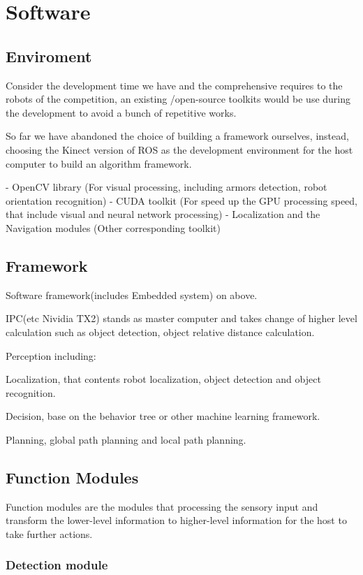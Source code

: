 \section{Software}
\subsection{Enviroment}

Consider the development time we have and the comprehensive requires to the robots of the competition, an existing /open-source toolkits would be use during the development to avoid a bunch of repetitive works.

So far we have abandoned the choice of building a framework ourselves, instead, choosing the Kinect version of ROS as the development environment for the host computer to build an algorithm framework.

- OpenCV library (For visual processing, including armors detection, robot orientation recognition)
- CUDA toolkit (For speed up the GPU processing speed, that include visual and neural network processing)
- Localization and the Navigation modules (Other corresponding toolkit)

\subsection{Framework}

Software framework(includes Embedded system) on above.

IPC(etc Nividia TX2) stands as master computer and takes change of higher level calculation such as object detection, object relative distance calculation.

Perception including:

Localization, that contents robot localization, object detection and object recognition.

Decision, base on the behavior tree or other machine learning framework.

Planning, global path planning and local path planning.

\subsection{Function Modules}

Function modules are the modules that processing the sensory input and transform the lower-level information to higher-level information for the host to take further actions.

\subsubsection{Detection module}

